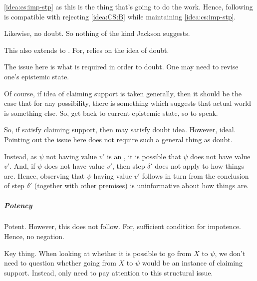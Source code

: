 \begin{note}
  \autoref{idea:cs:imp-stp} as this is the thing that's going to do the work.
  Hence, following is compatible with rejecting \autoref{idea:CS:B} while maintaining \autoref{idea:cs:imp-stp}.

  Likewise, no doubt.
  So nothing of the kind Jackson suggests.

  This also extends to \citeauthor{Wright:2011wn}.
  For, \citeauthor{Wright:2011wn} relies on the idea of doubt.

  The issue here is what is required in order to doubt.
  One may need to revise one's epistemic state.

  Of course, if idea of claiming support is taken generally, then it should be the case that for any possibility, there is something which suggests that actual world is something else.
  So, get back to current epistemic state, so to speak.

  So, if satisfy claiming support, then may satisfy doubt idea.
  However, ideal.
  Pointing out the issue here does not require such a general thing as doubt.
\end{note}

\begin{note}
  Instead, as \(\psi\) not having value \(v'\) is an \ep{}, it is possible that \(\psi\) does not have value \(v'\).
  And, if \(\psi\) does not have value \(v'\), then step \(\delta'\) does not apply to how things are.
  Hence, observing that \(\psi\) having value \(v'\) follows in turn from the conclusion of step \(\delta'\) (together with other premises) is uninformative about how things are.
\end{note}


\subparagraph{Potency}

\begin{note}
  Potent.
  However, this does not follow.
  For, sufficient condition for impotence.
  Hence, no negation.
\end{note}

\begin{note}
  Key thing.
  When looking at whether it is possible to go from \(X\) to \(\psi\), we don't need to question whether going from \(X\) to \(\psi\) would be an instance of claiming support.
  Instead, only need to pay attention to this structural issue.
\end{note}

